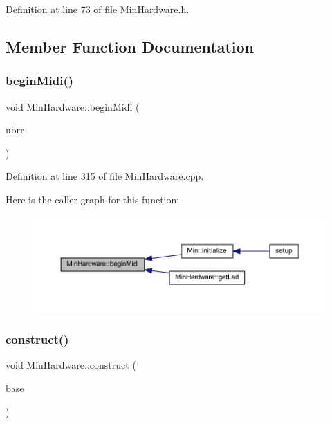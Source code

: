 Definition at line 73 of file Min\+Hardware.\+h.



\subsection{Member Function Documentation}
\mbox{\label{class_min_hardware_af4ce30a68a24c15d0149f2e65d72cc33}} 
\subsubsection{\texorpdfstring{begin\+Midi()}{beginMidi()}}
{\footnotesize\ttfamily void Min\+Hardware\+::begin\+Midi (\begin{DoxyParamCaption}\item[{unsigned int}]{ubrr }\end{DoxyParamCaption})}



Definition at line 315 of file Min\+Hardware.\+cpp.

Here is the caller graph for this function\+:
\nopagebreak
\begin{figure}[H]
\begin{center}
\leavevmode
\includegraphics[width=350pt]{d0/d93/class_min_hardware_af4ce30a68a24c15d0149f2e65d72cc33_icgraph}
\end{center}
\end{figure}
\mbox{\label{class_min_hardware_a39382d7c1fcdcec2858c01c05d4c35aa}} 
\subsubsection{\texorpdfstring{construct()}{construct()}}
{\footnotesize\ttfamily void Min\+Hardware\+::construct (\begin{DoxyParamCaption}\item[{\hyperlink{class_min_hardware_base}{Min\+Hardware\+Base} $\ast$}]{base }\end{DoxyParamCaption})}



